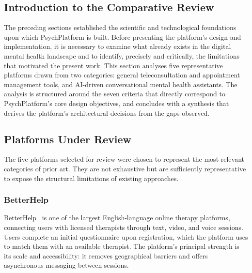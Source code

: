 \documentclass[a4paper,12pt]{report}
\begin{document}
\subsection*{Introduction to the Comparative Review}
{}
 
The preceding sections established the scientific and technological foundations upon
which PsychPlatform is built. Before presenting the platform's design and implementation,
it is necessary to examine what already exists in the digital mental health landscape and
to identify, precisely and critically, the limitations that motivated the present work.
This section analyses five representative platforms drawn from two categories: general
teleconsultation and appointment management tools, and AI-driven conversational mental
health assistants. The analysis is structured around the seven criteria that directly
correspond to PsychPlatform's core design objectives, and concludes with a synthesis
that derives the platform's architectural decisions from the gaps observed.
 
\subsection{Platforms Under Review}
\label{subsec:platforms}
 
The five platforms selected for review were chosen to represent the most relevant
categories of prior art. They are not exhaustive but are sufficiently representative
to expose the structural limitations of existing approaches.
 
\subsubsection{BetterHelp}
 
BetterHelp~\cite{BetterHelp2023} is one of the largest English-language online therapy
platforms, connecting users with licensed therapists through text, video, and voice
sessions. Users complete an initial questionnaire upon registration, which the platform
uses to match them with an available therapist. The platform's principal strength is
its scale and accessibility: it removes geographical barriers and offers asynchronous
messaging between sessions.
 
\end{document}
